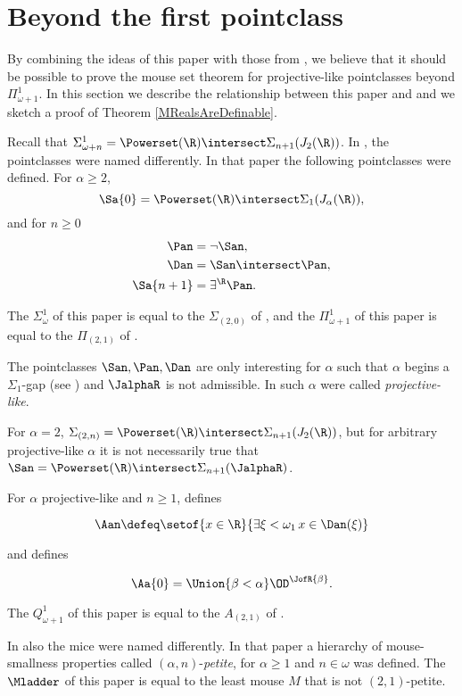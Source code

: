 \documentclass[oneside,12pt]{amsart}
\begin{document}
\section{Beyond the first pointclass}
\label{section:beyond_first_pointclass}

By combining the ideas of this paper with those from
\cite{Mouse_Sets}, we believe that it should be possible to prove the mouse set theorem
for projective-like pointclasses beyond $\Pi^1_{\omega+1}$. In this section we
describe the relationship between this paper and \cite{Mouse_Sets} and we
sketch a proof of Theorem \ref{MRealsAreDefinable}.

Recall that $\Sigma^1_{\omega+n} = \Powerset(\R)\intersect \Sigma_{n+1}(J_2(\R))$.
In \cite{Mouse_Sets}, the pointclasses were named differently. In that paper
the following pointclasses were defined. For $\alpha\geq 2$,
$$\Sa{0}=\Powerset(\R)\intersect \Sigma_{1}(J_{\alpha}(\R)),$$
and for $n\geq 0$
\begin{align*}
\Pan &= \neg \San, \\
\Dan &= \San \intersect \Pan, \\
\Sa{n+1} &= \exists^{\R} \Pan.
\end{align*}

The $\Sigma^1_{\omega}$ of this paper is equal
to the $\Sigma_{(2,0)}$ of \cite{Mouse_Sets}, and the
$\Pi^1_{\omega+1}$ of this paper is
equal to the $\Pi_{(2,1)}$ of \cite{Mouse_Sets}.

The pointclasses $\San,\Pan,\Dan$ are only interesting for $\alpha$ such that
$\alpha$ begins a $\Sigma_1$-gap (see \cite{Scales_In_LofR})
and $\JalphaR$ is not admissible. In
\cite{Mouse_Sets} such $\alpha$ were called \emph{projective-like}.

For $\alpha=2$, $\Sigma_{(2,n)}=\Powerset(\R)\intersect \Sigma_{n+1}(J_2(\R))$,
but for arbitrary projective-like  $\alpha$ it is not necessarily true that
$\San = \Powerset(\R)\intersect \Sigma_{n+1}(\JalphaR)$.

For $\alpha$ projective-like and $n\geq 1$, \cite{Mouse_Sets} defines

$$\Aan\defeq\setof{x\in\R}{\exists \xi<\omega_1\, x\in \Dan(\xi)}$$

and defines

$$\Aa{0} = \Union{\beta<\alpha} \OD^{\JofR{\beta}}.$$

The $Q^1_{\omega+1}$ of this paper is equal to the $A_{(2,1)}$ of \cite{Mouse_Sets}.

In \cite{Mouse_Sets} also the mice were named differently. In that paper
a hierarchy of mouse-smallness properties called $(\alpha,n)$-\emph{petite}, for $\alpha\geq 1$
and $n\in\omega$ was defined. The $\Mladder$ of this paper is equal to the least mouse
$M$ that is not $(2,1)$-petite.
\end{document}
